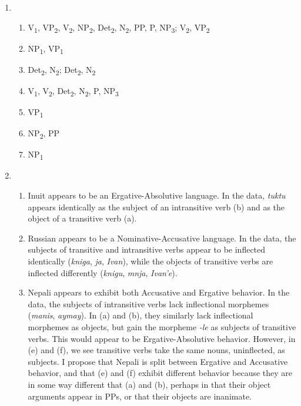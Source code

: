 \documentclass[doc,12pt]{apa6}
\begin{document}
\begin{enumerate}[resume]
	\item
	\begin{enumerate}
		\item V\textsubscript{1}, VP\textsubscript{2}, V\textsubscript{2}, NP\textsubscript{2}, Det\textsubscript{2}, N\textsubscript{2}, PP, P, NP\textsubscript{3}; V\textsubscript{2}, VP\textsubscript{2}
		\item NP\textsubscript{1}, VP\textsubscript{1}
		\item Det\textsubscript{2}, N\textsubscript{2}; Det\textsubscript{2}, N\textsubscript{2}
		\item V\textsubscript{1}, V\textsubscript{2}, Det\textsubscript{2}, N\textsubscript{2}, P, NP\textsubscript{3}
		\item VP\textsubscript{1}
		\item NP\textsubscript{2}, PP
		\item NP\textsubscript{1}
	\end{enumerate}

	\item
	\begin{enumerate}
		\item Inuit appears to be an Ergative-Absolutive language. In the data,
			\textit{tuktu} appears identically as the subject of an
			intransitive verb (b) and as the object of a transitive verb (a).
		\item Russian appears to be a Nominative-Accusative language. In the
			data, the subjects of transitive and intransitive verbs appear to
			be inflected identically (\textit{kniga}, \textit{ja},
			\textit{Ivan}), while the objects of transitive verbs are inflected
			differently (\textit{knigu}, \textit{mnja}, \textit{Ivan'e}).
		\item Nepali appears to exhibit both Accusative and Ergative behavior.
			In the data, the subjects of intransitive verbs lack inflectional
			morphemes (\textit{manis}, \textit{aymay}). In (a) and (b), they
			similarly lack inflectional morphemes as objects, but gain the
			morpheme \textit{-le} as subjects of transitive verbs. This would
			appear to be Ergative-Absolutive behavior. However, in (e) and (f),
			we see transitive verbs take the same nouns, uninflected, as
			subjects. I propose that Nepali is split between Ergative and
			Accusative behavior, and that (e) and (f) exhibit different
			behavior because they are in some way different that (a) and (b),
			perhaps in that their object arguments appear in PPs, or that their
			objects are inanimate.
	\end{enumerate}


\end{enumerate}
\end{document}
